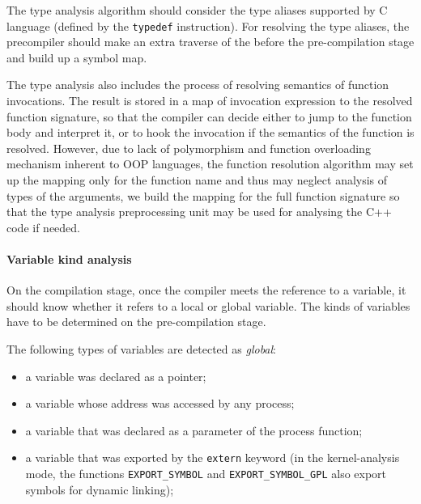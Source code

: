 The type analysis algorithm should consider the type aliases supported by C language (defined by the \texttt{typedef} instruction).
For resolving the type aliases, the precompiler should make an extra traverse of the \ytree{} before the pre-compilation stage and build up a symbol map.

The type analysis also includes the process of resolving semantics of function invocations.
The result is stored in a map of invocation expression to the resolved function signature, so that the compiler can decide either to jump to the function body and interpret it, or to hook the invocation if the semantics of the function is resolved.
However, due to lack of polymorphism and function overloading mechanism inherent to OOP languages, the function resolution algorithm may set up the mapping only for the function name and thus may neglect analysis of types of the arguments, we build the mapping for the full function signature so that the type analysis preprocessing unit may be used for analysing the C++ code if needed.



\paragraph{Variable kind analysis}
\label{ch:impl:proc:x-pre-compiler:var}

On the compilation stage, once the compiler meets the reference to a variable, it should know whether it refers to a local or global variable.
The kinds of variables have to be determined on the pre-compilation stage.

\vspace{1em}
The following types of variables are detected as \textit{global}:
\begin{itemize}
\item a variable was declared as a pointer;
\item a variable whose address was accessed by any process;
\item a variable that was declared as a parameter of the process function;
\item a variable that was exported by the \texttt{extern} keyword (in the kernel-analysis mode, the functions \texttt{EXPORT\_SYMBOL} and \texttt{EXPORT\_SYMBOL\_GPL} also export symbols for dynamic linking); %
\end{itemize}



